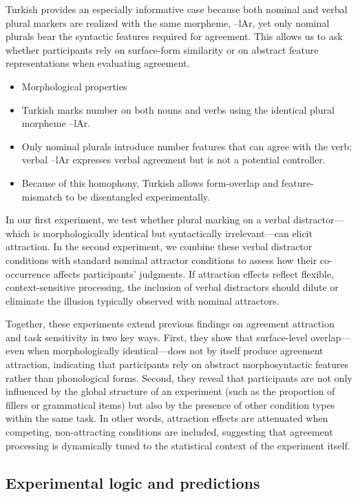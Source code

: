 \documentclass[
  authoryear,
  preprint]{elsarticle}
\providecommand{\tightlist}{%
  \setlength{\itemsep}{0pt}\setlength{\parskip}{0pt}}
\begin{document}
Turkish provides an especially informative case because both nominal and
verbal plural markers are realized with the same morpheme, --lAr, yet
only nominal plurals bear the syntactic features required for agreement.
This allows us to ask whether participants rely on surface-form
similarity or on abstract feature representations when evaluating
agreement.

\begin{itemize}
\tightlist
\item
  Morphological properties
\item
  Turkish marks number on both nouns and verbs using the identical
  plural morpheme --lAr.
\item
  Only nominal plurals introduce number features that can agree with the
  verb; verbal --lAr expresses verbal agreement but is not a potential
  controller.
\item
  Because of this homophony, Turkish allows form-overlap and
  feature-mismatch to be disentangled experimentally.
\end{itemize}

In our first experiment, we test whether plural marking on a verbal
distractor---which is morphologically identical but syntactically
irrelevant---can elicit attraction. In the second experiment, we combine
these verbal distractor conditions with standard nominal attractor
conditions to assess how their co-occurrence affects participants'
judgments. If attraction effects reflect flexible, context-sensitive
processing, the inclusion of verbal distractors should dilute or
eliminate the illusion typically observed with nominal attractors.

Together, these experiments extend previous findings on agreement
attraction and task sensitivity in two key ways. First, they show that
surface-level overlap---even when morphologically identical---does not
by itself produce agreement attraction, indicating that participants
rely on abstract morphosyntactic features rather than phonological
forms. Second, they reveal that participants are not only influenced by
the global structure of an experiment (such as the proportion of fillers
or grammatical items) but also by the presence of other condition types
within the same task. In other words, attraction effects are attenuated
when competing, non-attracting conditions are included, suggesting that
agreement processing is dynamically tuned to the statistical context of
the experiment itself.

\subsection{Experimental logic and
predictions}\label{experimental-logic-and-predictions}
\end{document}
